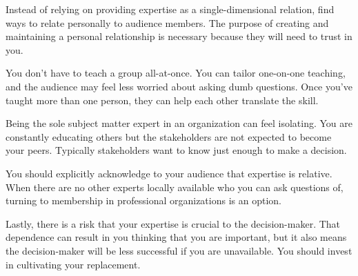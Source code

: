 Instead of relying on providing expertise as a single-dimensional relation, find ways to relate personally to audience members. The purpose of creating and maintaining a personal relationship is necessary because they will need to trust in you.


You don't have to teach a group all-at-once. You can tailor one-on-one teaching, and the audience may feel less worried about asking dumb questions.
Once you've taught more than one person, they can help each other translate the skill. 


Being the sole subject matter expert in an organization can feel isolating. You are constantly educating others but the stakeholders are not expected to become your peers. Typically stakeholders want to know just enough to make a decision. 

You should explicitly acknowledge to your audience that expertise is relative. When there are no other experts locally available who you can ask questions of, turning to membership in professional organizations is an option.

Lastly, there is a risk that your expertise is crucial to the decision-maker. That dependence can result in you thinking that you are important, but it also means the decision-maker will be less successful if you are unavailable. You should invest in cultivating your replacement. 

